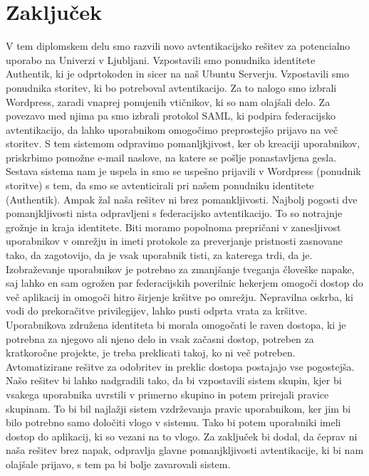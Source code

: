 \documentclass[a4paper,12pt,openright]{book}
\begin{document}
\chapter{Zaključek}

V tem diplomskem delu smo razvili novo avtentikacijsko rešitev za potencialno uporabo na Univerzi v Ljubljani. Vzpostavili smo ponudnika identitete Authentik, ki je odprtokoden in sicer na naš Ubuntu Serverju. Vzpostavili smo ponudnika storitev, ki bo potreboval avtentikacijo. Za to nalogo smo izbrali Wordpress, zaradi vnaprej ponujenih vtičnikov, ki so nam olajšali delo. Za povezavo med njima pa smo izbrali protokol SAML, ki podpira federacijsko avtentikacijo, da lahko uporabnikom omogočimo preprostejšo prijavo na več storitev. 
\newline
S tem sistemom odpravimo pomanljkjivost, ker ob kreaciji uporabnikov, priskrbimo pomožne e-mail naslove, na katere se pošlje ponastavljena gesla. 
\newline
Sestava sistema nam je uspela in smo se uspešno prijavili v Wordpress (ponudnik storitve) s tem, da smo se avtenticirali pri našem ponudniku identitete (Authentik). 
\newline
Ampak žal naša rešitev ni brez pomankljivosti. Najbolj pogosti dve pomanjkljivosti nista odpravljeni s federacijsko avtentikacijo. To so notrajnje grožnje in kraja identitete. Biti moramo popolnoma prepričani v zanesljivost uporabnikov v omrežju in imeti protokole za preverjanje pristnosti zasnovane tako, da zagotovijo, da je vsak uporabnik tisti, za katerega trdi, da je. Izobraževanje uporabnikov je potrebno za zmanjšanje tveganja človeške napake, saj lahko en sam ogrožen par federacijskih poverilnic hekerjem omogoči dostop do več aplikacij in omogoči hitro širjenje kršitve po omrežju.
Nepravilna oskrba, ki vodi do prekoračitve privilegijev, lahko pusti odprta vrata za kršitve. Uporabnikova združena identiteta bi morala omogočati le raven dostopa, ki je potrebna za njegovo ali njeno delo in vsak začasni dostop, potreben za kratkoročne projekte, je treba preklicati takoj, ko ni več potreben. Avtomatizirane rešitve za odobritev in preklic dostopa postajajo vse pogostejša.
\newline
Našo rešitev bi lahko nadgradili tako, da bi vzpostavili sistem skupin, kjer bi vsakega uporabnika uvrstili v primerno skupino in potem prirejali pravice skupinam. To bi bil najlažji sistem vzdrževanja pravic uporabnikom, ker jim bi bilo potrebno samo določiti vlogo v sistemu. Tako bi potem uporabniki imeli dostop do aplikacij, ki so vezani na to vlogo. 
\newline
Za zaključek bi dodal, da čeprav ni naša rešitev brez napak, odpravlja glavne pomanjkljivosti avtentikacije, ki bi nam olajšale prijavo, s tem pa bi bolje zavarovali sistem. 
\end{document}
